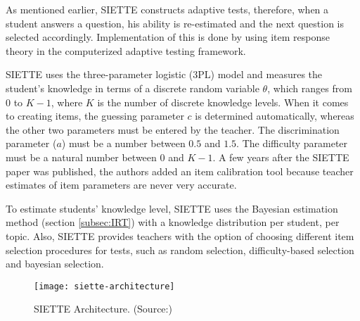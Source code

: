 As mentioned earlier, SIETTE constructs adaptive tests, therefore, when a student answers a question, his ability is re-estimated and the next question is selected accordingly. Implementation of this is done by using item response theory in the computerized adaptive testing framework.\newline

SIETTE uses the three-parameter logistic (3PL) model and measures the student's knowledge in terms of a discrete random variable $\theta$, which ranges from 0 to $K-1$, where $K$ is the number of discrete knowledge levels. When it comes to creating items, the guessing parameter $c$ is determined automatically, whereas the other two parameters must be entered by the teacher. The discrimination parameter ($a$) must be a number between $0.5$ and $1.5$. The difficulty parameter must be a natural number between 0 and $K-1$. A few years after the SIETTE paper was published, the authors added an item calibration tool because teacher estimates of item parameters are never very accurate.\newline

To estimate students' knowledge level, SIETTE uses the Bayesian estimation method (section \ref{subsec:IRT}) with a knowledge distribution per student, per topic. Also, SIETTE provides teachers with the option of choosing different item selection procedures for tests, such as random selection, difficulty-based selection and bayesian selection.

\begin{figure}[H]
\centering
\texttt{[image: siette-architecture]}
\caption{SIETTE Architecture. (Source:\cite{SIETTE})}
\label{fig:siette-architecture}
\end{figure}

